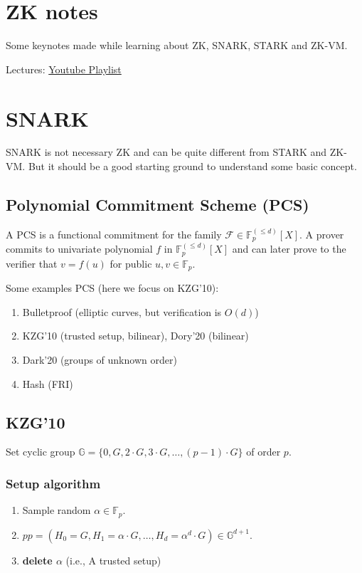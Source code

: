 \documentclass[10pt]{article}
\newcommand{\FFamily}{\mathbb{F}^{(\leq d)}_p[X]}
\newcommand{\FField}{\mathbb{F}_p}
\begin{document}
\section*{ZK notes}
\begin{description}
    \item Some keynotes made while learning about ZK, SNARK, STARK and ZK-VM.
    \item Lectures: \href{https://www.youtube.com/playlist?
        list=PLj80z0cJm8QErn3akRcqvxUsyXWC81OGq}{Youtube Playlist}
\end{description}

\section{SNARK}
SNARK is not necessary ZK and can be quite different from STARK and ZK-VM. But
it should be a good starting ground to understand some basic concept.

\subsection{Polynomial Commitment Scheme (PCS)}
A PCS is a functional commitment for the family $\mathcal{F} \in \FFamily$.
A prover commits to univariate polynomial $f$ in $\FFamily$ and can later prove
to the verifier that $v = f(u)$ for public $u, v \in \FField$.

Some examples PCS (here we focus on KZG'10):
\begin{enumerate}
    \item Bulletproof (elliptic curves, but verification is $O(d)$)
    \item KZG'10 (trusted setup, bilinear), Dory'20 (bilinear)
    \item Dark'20 (groups of unknown order)
    \item Hash (FRI)
\end{enumerate}

\subsection{KZG'10}
Set cyclic group $\mathbb{G} = \{0, G, 2 \cdot G, 3 \cdot G, \ldots, (p-1) \cdot
G\}$ of order $p$.

\subsubsection*{Setup algorithm}
\begin{enumerate}
    \item Sample random $\alpha \in \FField$.
    \item $pp = (H_0 = G, H_1 = \alpha \cdot G, \ldots, H_d = \alpha^d \cdot G)
        \in \mathbb{G}^{d+1}$.
    \item \textbf{delete $\alpha$} (i.e., A trusted setup)
\end{enumerate}
\end{document}
